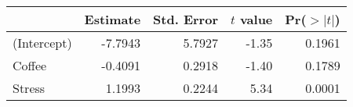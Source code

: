\begin{table}[ht]
\begin{center}
\begin{tabular}{lrrrr}
  \hline
 & Estimate & Std. Error & $t$ value & Pr($>|t|$) \\ 
  \hline
(Intercept) & -7.7943 & 5.7927 & -1.35 & 0.1961 \\ 
  Coffee & -0.4091 & 0.2918 & -1.40 & 0.1789 \\ 
  Stress & 1.1993 & 0.2244 & 5.34 & 0.0001 \\ 
   \hline
\end{tabular}
\end{center}
\end{table}
